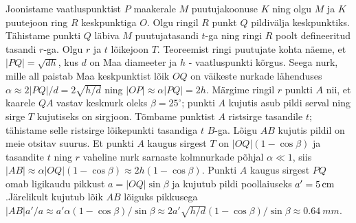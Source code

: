 Joonistame vaatluspunktist $P$ maakerale $M$ puutujakoonuse $K$ ning olgu $M$ ja $K$ puutejoon ring $R$ keskpunktiga $O$. Olgu ringil $R$ punkt $Q$ pildivälja keskpunktiks. Tähistame punkti $Q$ läbiva $M$ puutujatasandi $t$-ga ning ringi $R$ poolt defineeritud tasandi $r$-ga. Olgu $r$ ja $t$ lõikejoon $T$. Teoreemist ringi puutujate kohta näeme, et $|PQ|=\sqrt{dh}$, kus $d$ on Maa diameeter ja $h$ - vaatluspunkti kõrgus. Seega nurk, mille all paistab Maa keskpunktist lõik $OQ$ on väikeste nurkade lähenduses $\alpha \approx 2|PQ|/d=2\sqrt{h/d}$ ning $|OP|\approx \alpha |PQ|=2h$. Märgime ringil $r$ punkti $A$ nii, et kaarele $QA$ vastav kesknurk oleks $\beta=25^\circ$; punkti $A$ kujutis asub pildi serval ning sirge $T$ kujutiseks on sirgjoon. Tõmbame punktist $A$ ristsirge tasandile $t$; tähistame selle ristsirge lõikepunkti tasandiga $t$ $B$-ga. Lõigu $AB$ kujutis pildil on meie otsitav suurus. Et punkti $A$ kaugus sirgest $T$ on $|OQ|(1-\cos\beta)$ ja tasandite $t$ ning $r$ vaheline nurk sarnaste kolmnurkade põhjal $\alpha \ll 1$, siis $|AB|\approx \alpha |OQ|(1-\cos\beta)\approx 2h(1-\cos\beta)$. Punkti $A$ kaugus sirgest $PQ$ omab ligikaudu pikkust $a=|OQ|\sin\beta$ ja kujutub pildi poollaiuseks $a'=\SI 5{cm}$.Järelikult kujutub lõik $AB$ lõiguks pikkusega $|AB|a'/a\approx a'\alpha(1-\cos\beta)/\sin\beta\approx 2a'\sqrt{h/d}(1-\cos\beta)/\sin\beta\approx \SI{0.64}{mm}$.\probend